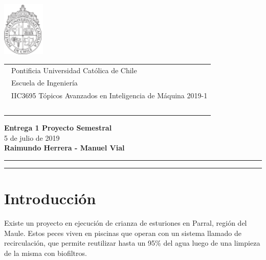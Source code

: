 \documentclass[letterpaper, 12pt]{article}
\begin{document}
\vspace*{-1cm}
\includegraphics[width=2cm]{logo.pdf}
\vspace*{-2cm}

\hspace*{2cm}
 \begin{tabular}{l}
  {\ Pontificia Universidad Católica de Chile}\\
  {\ Escuela de Ingeniería}\\
  {\ IIC3695 Tópicos Avanzados en Inteligencia de Máquina 2019-1 }\\
  {\  }\\
 \end{tabular}
 \hfill
\vspace*{-0.2cm}
\begin{center}
{\Large\bf Entrega 1 Proyecto Semestral}\\
\vspace*{3mm}
{5 de julio de 2019}\\
\vspace*{1mm}
{\bf Raimundo Herrera - Manuel Vial }\\
\vspace*{1mm}
\end{center}
\hrule\vspace*{2pt}\hrule
\thispagestyle{empty}





\section{Introducción}

Existe un proyecto en ejecución de crianza de esturiones en Parral, región del Maule. Estos peces viven en piscinas que operan con un sistema llamado de recirculación, que permite reutilizar hasta un 95\% del agua luego de una limpieza de la misma con biofiltros.\\
\end{document}
